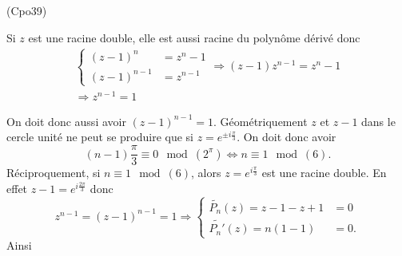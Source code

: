 \begin{tiny}(Cpo39)\end{tiny} Si $z$ est une racine double, elle est aussi racine du polynôme dérivé donc
\begin{multline*}
 \left\lbrace 
 \begin{aligned}
  (z-1)^n &= z^n - 1 \\ (z-1)^{n-1} &= z^{n-1}
 \end{aligned}
 \right. 
 \Rightarrow (z-1)z^{n-1} = z^n -1 \\
 \Rightarrow z^{n-1} = 1
\end{multline*}

On doit donc aussi avoir $(z-1)^{n-1}=1$. Géométriquement $z$ et $z-1$ dans le cercle unité ne peut se produire que si $z=e^{\pm i \frac{\pi}{3}}$. On doit donc avoir 
\[
 (n-1)\frac{\pi}{3} \equiv 0 \mod(2^\pi)
 \Leftrightarrow n \equiv 1 \mod(6).
\]
Réciproquement, si $n \equiv 1 \mod(6)$, alors $z=e^{i\frac{\pi}{3}}$ est une racine double. En effet $z-1=e^{i\frac{2\pi}{3}}$ donc 
\[
 z^{n-1} = (z-1)^{n-1} = 1 
 \Rightarrow 
 \left\lbrace 
 \begin{aligned}
   \widetilde{P_n}(z) = z - 1 -z +1 &= 0 \\
   \widetilde{P_n'}(z) = n(1-1) &= 0.
 \end{aligned}
\right. 
\]
Ainsi
